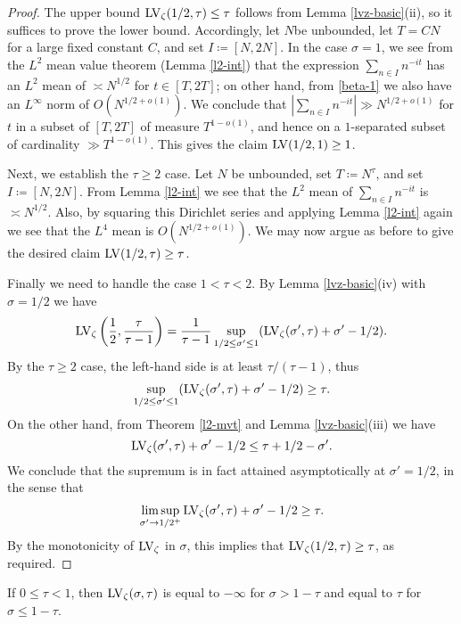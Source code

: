 \begin{proof}  The upper bound $\mathrm{LV}_\zeta(1/2,\tau) \leq \tau$  follows from Lemma \ref{lvz-basic}(ii), so it suffices to prove the lower bound.  Accordingly, let $N$be unbounded, let $T  = CN$ for a large fixed constant $C$, and set $I \coloneqq [N,2N]$.  In the case $\sigma=1$, we see from the $L^2$ mean value theorem (Lemma \ref{l2-int}) that the expression $\sum_{n \in I} n^{-it}$ has an $L^2$ mean of $\asymp N^{1/2}$ for $t \in [T,2T]$; on other hand, from \eqref{beta-1} we also have an $L^\infty$ norm of $O(N^{1/2+o(1)})$.  We conclude that $|\sum_{n \in I} n^{-it}| \gg N^{1/2+o(1)}$ for $t$ in a subset of $[T,2T]$ of measure $T^{1-o(1)}$, and hence on a $1$-separated subset of cardinality $\gg T^{1-o(1)}$.  This gives the claim $\mathrm{LV}(1/2,1) \geq 1$.

Next, we establish the $\tau \geq 2$ case.
Let $N$ be unbounded, set $T \coloneqq N^\tau$, and set $I \coloneqq [N,2N]$.  From Lemma \ref{l2-int} we see that the $L^2$ mean of $\sum_{n \in I} n^{-it}$ is $\asymp N^{1/2}$.  Also, by squaring this Dirichlet series and applying Lemma \ref{l2-int} again we see that the $L^4$ mean is $O(N^{1/2+o(1)})$.  We may now argue as before to give the desired claim $\mathrm{LV}(1/2,\tau) \geq \tau$.

Finally we need to handle the case $1 < \tau < 2$. By Lemma \ref{lvz-basic}(iv) with $\sigma=1/2$ we have
$$ \mathrm{LV}_\zeta\left(\frac{1}{2}, \frac{\tau}{\tau-1}\right) = \frac{1}{\tau-1}  \sup_{1/2 \leq \sigma' \leq 1} (\mathrm{LV}_\zeta(\sigma',\tau) + \sigma'-1/2).$$
By the $\tau \geq 2$ case, the left-hand side is at least $\tau/(\tau-1)$, thus
$$ \sup_{1/2 \leq \sigma' \leq 1} (\mathrm{LV}_\zeta(\sigma',\tau) + \sigma'-1/2) \geq \tau.$$
On the other hand, from Theorem \ref{l2-mvt} and Lemma \ref{lvz-basic}(iii) we have
$$ \mathrm{LV}_\zeta(\sigma',\tau) + \sigma'-1/2 \leq \tau + 1/2 - \sigma'.$$
We conclude that the supremum is in fact attained asymptotically at $\sigma'=1/2$, in the sense that
$$ \limsup_{\sigma' \to 1/2^+} \mathrm{LV}_\zeta(\sigma',\tau) + \sigma'-1/2 \geq \tau.$$
By the monotonicity of $\mathrm{LV}_\zeta$ in $\sigma$, this implies that $\mathrm{LV}_\zeta(1/2,\tau) \geq \tau$, as required.
\end{proof}

\begin{lemma}\label{lvz-small-tau} If $0 \leq \tau < 1$, then $\mathrm{LV}_\zeta(\sigma,\tau)$ is equal to $-\infty$ for $\sigma > 1-\tau$ and equal to $\tau$ for $\sigma \leq 1-\tau$.
\end{lemma}

